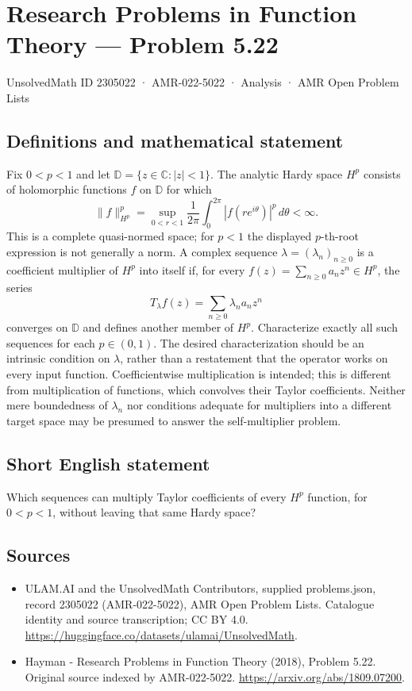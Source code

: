 \documentclass[11pt,a4paper]{article}
\begin{document}
\section*{Research Problems in Function Theory — Problem 5.22}\label{2305022}
{\small UnsolvedMath ID 2305022 · AMR-022-5022 · Analysis · AMR Open Problem Lists}
\subsection{Definitions and mathematical statement}
Fix $0<p<1$ and let $\mathbb D=\{z\in\mathbb C:|z|<1\}$. The analytic Hardy space $H^p$ consists of holomorphic functions $f$ on $\mathbb D$ for which
\[
\|f\|_{H^p}^p=\sup_{0<r<1}\frac1{2\pi}
\int_0^{2\pi}|f(re^{i\theta})|^p\,d\theta<\infty.
\]
This is a complete quasi-normed space; for $p<1$ the displayed $p$-th-root expression is not generally a norm.
A complex sequence $\lambda=(\lambda_n)_{n\ge0}$ is a coefficient multiplier of $H^p$ into itself if, for every $f(z)=\sum_{n\ge0}a_nz^n\in H^p$, the series
\[
T_\lambda f(z)=\sum_{n\ge0}\lambda_na_nz^n
\]
converges on $\mathbb D$ and defines another member of $H^p$. Characterize exactly all such sequences for each $p\in(0,1)$.
The desired characterization should be an intrinsic condition on $\lambda$, rather than a restatement that the operator works on every input function. Coefficientwise multiplication is intended; this is different from multiplication of functions, which convolves their Taylor coefficients. Neither mere boundedness of $\lambda_n$ nor conditions adequate for multipliers into a different target space may be presumed to answer the self-multiplier problem.
\subsection{Short English statement}
Which sequences can multiply Taylor coefficients of every $H^p$ function, for $0<p<1$, without leaving that same Hardy space?
\subsection{Sources}
\begin{itemize}
\item[S1] ULAM.AI and the UnsolvedMath Contributors, supplied problems.json, record 2305022 (AMR-022-5022), AMR Open Problem Lists. Catalogue identity and source transcription; CC BY 4.0.
\url{https://huggingface.co/datasets/ulamai/UnsolvedMath}.
\item[S2] Hayman - Research Problems in Function Theory (2018), Problem 5.22. Original source indexed by AMR-022-5022.
\url{https://arxiv.org/abs/1809.07200}.
\end{itemize}
\end{document}
